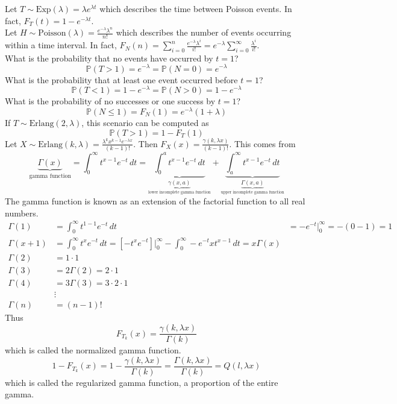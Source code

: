 \documentclass[12pt]{article}
\newcommand{\prob}[1]{\mathbb{P}(#1)}
\begin{document}
Let $T \sim \text{Exp}(\lambda) = \lambda e^{\lambda t}$ which describes the time between Poisson events. In fact, $F_T(t) = 1 - e^{-\lambda t}$. \\
Let $H \sim \text{Poisson}(\lambda) = \frac{e^{-\lambda} \lambda^n}{n!}$ which describes the number of events occurring within a time interval. In fact, $F_N(n) = \sum_{i = 0}^n \frac{e^{-\lambda} \lambda^i}{i!} = e^{-\lambda} \sum_{i = 0}^{\infty} \frac{\lambda^i}{i!}$. \\
What is the probability that no events have occurred by $t = 1$? 
$$\prob{T > 1} = e^{-\lambda} = \prob{N = 0} = e^{-\lambda}$$ 
What is the probability that at least one event occurred before $t = 1$? 
$$\prob{T < 1} = 1 - e^{-\lambda} = \prob{N > 0} = 1 - e^{-\lambda} $$ 
What is the probability of no successes or one success by $t = 1$? $$\prob{N \leq 1} = F_N(1) = e^{-\lambda}(1 + \lambda) $$ 
If $T \sim \text{Erlang}(2, \lambda)$, this scenario can be computed as $$\prob{T > 1} = 1 - F_T(1)$$ 
Let $X \sim \text{Erlang}(k, \lambda) = \frac{\lambda^k x^{k - 1}e^{-\lambda x}}{(k - 1)!}$. Then $F_X(x) = \frac{\gamma(k, \lambda x)}{(k - 1)!}$. This comes from $$\underbrace{\Gamma(x)}_{\text{gamma function}} = \int_0^{\infty} t^{x - 1} e^{-t} \, dt = \underbrace{\int_0^a t^{x - 1} e^{-t} \, dt}_{\underbrace{\gamma(x, a)}_{\text{lower incomplete gamma function}}} + \underbrace{\int_a^{\infty} t^{x - 1} e^{-t} \, dt}_{\underbrace{\Gamma(x, a)}_{\text{upper incomplete gamma function}}} $$ 
The gamma function is known as an extension of the factorial function to all real numbers. 
$$\begin{aligned} \Gamma(1) &= \int_0^{\infty} t^{1 - 1} e^{-t} \, dt &= -e^{-t} \Big|_0^{\infty} = - (0 - 1) = 1 \\ 
\Gamma(x  +1) &= \int_0^{\infty} t^x e^{-t} \, dt = [-t^x e^{-t}]\Big|_0^{\infty} - \int_0^{\infty} -e^{-t}xt^{x - 1} \, dt = x\Gamma(x) \\ 
\Gamma(2) &= 1 \cdot 1 \\ \Gamma(3) &= 2\Gamma(2) = 2 \cdot 1 \\ \Gamma(4) &= 3 \Gamma(3) = 3 \cdot 2 \cdot 1 \\ &\vdots \\ \Gamma(n) &= (n - 1)! \end{aligned} $$ 
Thus $$F_{T_k}(x) = \frac{\gamma(k, \lambda x)}{\Gamma(k)}$$ 
which is called the normalized gamma function. 
$$1 - F_{T_k}(x) = 1 - \frac{\gamma(k, \lambda x)}{\Gamma(k)} = \frac{\Gamma(k, \lambda x)}{\Gamma(k)} = Q(l, \lambda x) $$ which is called the regularized gamma function, a proportion of the entire gamma. \\~\\
\end{document}
